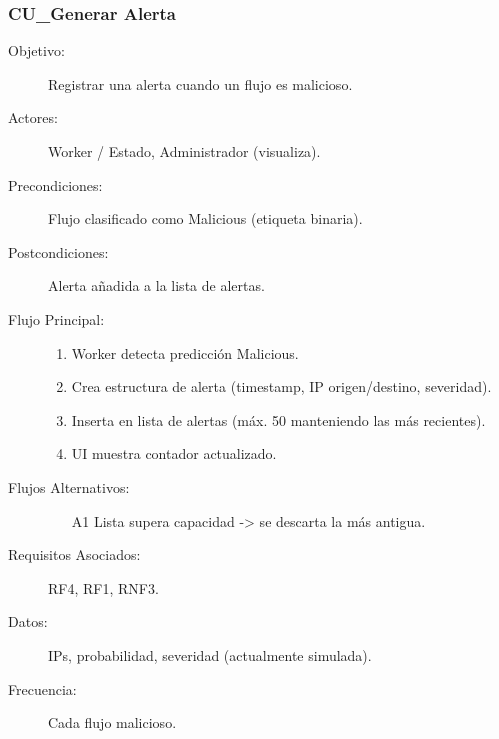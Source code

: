 \subsubsection{CU\_Generar Alerta}
\begin{description}
  \item[Objetivo:] Registrar una alerta cuando un flujo es malicioso.
  \item[Actores:] Worker / Estado, Administrador (visualiza).
  \item[Precondiciones:] Flujo clasificado como Malicious (etiqueta binaria).
  \item[Postcondiciones:] Alerta añadida a la lista de alertas.
  \item[Flujo Principal:]
    \begin{enumerate}
      \item Worker detecta predicción Malicious.
      \item Crea estructura de alerta (timestamp, IP origen/destino, severidad).
      \item Inserta en lista de alertas (máx. 50 manteniendo las más recientes).
      \item UI muestra contador actualizado.
    \end{enumerate}
  \item[Flujos Alternativos:]
    \begin{enumerate}
      \item[A1] Lista supera capacidad -> se descarta la más antigua.
    \end{enumerate}
  \item[Requisitos Asociados:] RF4, RF1, RNF3.
  \item[Datos:] IPs, probabilidad, severidad (actualmente simulada).
  \item[Frecuencia:] Cada flujo malicioso.
\end{description}

